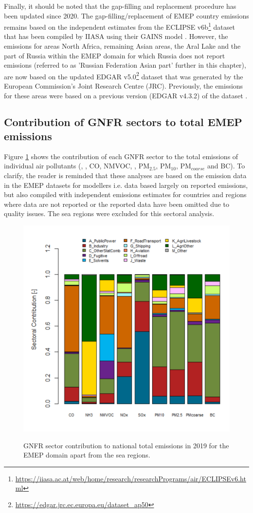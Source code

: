 Finally, it should be noted that the gap-filling and replacement procedure has been updated since 2020. The gap-filling/replacement of EMEP country emissions remains based on the independent estimates from the ECLIPSE v6b\footnote{\url{https://iiasa.ac.at/web/home/research/researchPrograms/air/ECLIPSEv6.html}} dataset that has been compiled by IIASA using their GAINS model \citep{Amann_et_al:2011}. However, the emissions for areas North Africa, remaining Asian areas, the Aral Lake and the part of Russia within the EMEP domain for which Russia does not report emissions (referred to as 'Russian Federation Asian part' further in this chapter), are now based on the updated EDGAR v5.0\footnote{\url{https://edgar.jrc.ec.europa.eu/dataset_ap50}}  dataset \citep{EDGARv50} that was generated by the European Commission's Joint Research Centre (JRC). Previously, the emissions for these areas were based on a previous version (EDGAR v4.3.2) of the dataset \citep{EDGARv432}.


\subsection{Contribution of GNFR sectors to total EMEP emissions}
\label{sec:GNFRsec}

Figure \ref{fig:CEIP6} shows the contribution of each GNFR sector to the
total emissions of individual air pollutants (\sox, \nox, CO, NMVOC,
\nhiii, PM$_{2.5}$, PM$_{10}$, PM$_{coarse}$ and BC).
To clarify, the reader is reminded that these analyses are based on the emission data in the EMEP datasets for modellers i.e. data based largely on reported emissions, but also compiled with independent emissions estimates for countries and regions where data are not reported or the reported data have been omitted due to quality issues. The sea regions were excluded for this sectoral analysis.


\begin{figure}[h]
\centering
{\includegraphics*[viewport=1 1 565 565,clip,width=0.65\linewidth]{FIGS_CEIP/Fig6.pdf}}
\caption{GNFR sector contribution to national total emissions in 2019
  for the EMEP domain apart from the  sea regions.}
\label{fig:CEIP6}
\end{figure}


